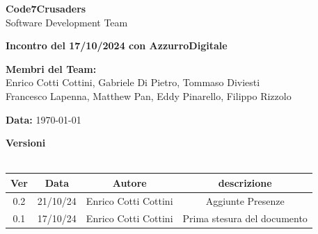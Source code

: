 \documentclass{article}
\begin{document}
\begin{titlepage}
    {\Huge \textbf{Code7Crusaders}}\\
    \vspace{0.5cm}
    {\Large Software Development Team}\\
    \vspace{2cm}
    
    {\large \textbf{Incontro del 17/10/2024 con AzzurroDigitale }}\\
    \vspace{5cm}

    \textbf{Membri del Team:}\\
    Enrico Cotti Cottini, Gabriele Di Pietro, Tommaso Diviesti \\
    Francesco Lapenna, Matthew Pan, Eddy Pinarello, Filippo Rizzolo \\
    \vspace{0.5cm}
    
    {\large \textbf{Data:}} \today\\
    
    \vspace{1cm}
\end{titlepage}

\tableofcontents
\newpage
\begin{center}
    \textbf{Versioni}
    \\
    \\
    \begin{tabular}{|c|c|c|c|}
        \hline
        \textbf{Ver} & \textbf{Data} & \textbf{Autore} & \textbf{descrizione}\\
        \hline
        0.2 & 21/10/24 & Enrico Cotti Cottini & Aggiunte Presenze \\ 
        0.1 & 17/10/24 & Enrico Cotti Cottini & Prima stesura del documento \\ 
        \hline
    \end{tabular}
\end{center}
\newpage
\end{document}
